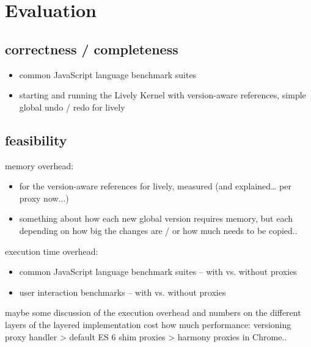 \section{Evaluation} \label{sec:EVALUATION}

\subsection{correctness / completeness}

\begin{itemize}
    \item common JavaScript language benchmark suites
    \item starting and running the Lively Kernel with version-aware references, simple global undo / redo for lively
\end{itemize}



\subsection{feasibility}

memory overhead:
\begin{itemize}
    \item for the version-aware references for lively, measured (and explained… per proxy now...)
    \item something about how each new global version requires memory, but each depending on how big the changes are / or how much needs to be copied..
\end{itemize}


execution time overhead:
\begin{itemize}
    \item common JavaScript language benchmark suites – with vs. without proxies
    \item user interaction benchmarks – with vs. without proxies
\end{itemize}

maybe some discussion of the execution overhead and numbers on the different layers of the layered implementation cost how much performance: versioning proxy handler > default ES 6 shim proxies > harmony proxies in Chrome..